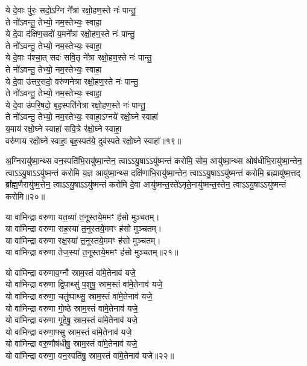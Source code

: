 ये दे॒वाः पु॑रः॒ सदो॒ऽग्नि ने᳚त्रा रक्षो॒हण॒स्ते नः॑ पान्तु॒\\
ते नो॑ऽवन्तु॒  तेभ्यो॒ नम॒स्तेभ्यः॒ स्वाहा॒\\
ये दे॒वा द॑क्षिण॒सदो॑ य॒मने᳚त्रा रक्षो॒हण॒स्ते नः॑ पान्तु॒\\
ते नो॑ऽवन्तु॒  तेभ्यो॒ नम॒स्तेभ्यः॒ स्वाहा॒\\
ये दे॒वाः प॑श्चा॒त् सदः॑ सवि॒तृ ने᳚त्रा रक्षो॒हण॒स्ते नः॑ पान्तु॒\\
ते नो॑ऽवन्तु॒  तेभ्यो॒ नम॒स्तेभ्यः॒ स्वाहा॒\\
ये दे॒वा उ॑त्तर॒सदो॒ वरु॑णनेत्रा रक्षो॒हण॒स्ते नः॑ पान्तु॒\\
ते नो॑ऽवन्तु॒  तेभ्यो॒ नम॒स्तेभ्यः॒ स्वाहा॒\\
ये दे॒वा उ॑परि॒षदो॒ बृह॒स्पति॑नेत्रा रक्षो॒हण॒स्ते नः॑ पान्तु॒\\
ते नो॑ऽवन्तु॒  तेभ्यो॒ नम॒स्तेभ्यः॒ स्वाहा॒ऽग्नये॑ रक्षो॒घ्ने स्वाहा॑\\
य॒माय॑ रक्षो॒घ्ने स्वाहा॑ सवि॒त्रे र॑क्षो॒घ्ने स्वाहा॒\\
वरु॑णाय रक्षो॒घ्ने स्वाहा॒ बृह॒स्पत॑ये॒ दुव॑स्पते रक्षो॒घ्ने स्वाहा᳚॥१९॥

अ॒ग्निरायु॑ष्मा॒न्थ्स वन॒स्पति॑भि॒रायु॑ष्मा॒न्तेन॒ त्वाऽऽयु॒षा\-ऽऽयु॑ष्मन्तं करोमि॒
सोम॒ आयु॑ष्मा॒न्थ्स ओष॑धीभि॒रायु॑ष्मा॒न्तेन॒ त्वाऽऽयु॒षा\-ऽऽयु॑ष्मन्तं करोमि
य॒ज्ञ आयु॑ष्मा॒न्थ्स दक्षि॑णाभि॒रायु॑ष्मा॒न्तेन॒ त्वाऽऽयु॒षा\-ऽऽयु॑ष्मन्तं करोमि॒
ब्रह्मायु॑ष्म॒त्तद् ब्रा᳚ह्म॒णैरायु॑ष्म॒त्तेन॒ त्वाऽऽयु॒षा\-ऽऽयु॑ष्मन्तं करोमि
दे॒वा आयु॑ष्मन्त॒स्ते॑ऽमृते॒नायु॑ष्मन्त॒स्तेन॒ त्वा\-ऽऽयु॒षाऽऽयु॑ष्मन्तं करोमि॥२०॥

या वा॑मिन्द्रा वरुणा यत॒व्या॑ त॒नूस्तये॒ममꣳ ह॑सो मुञ्चतम्।\\
या वा॑मिन्द्रा वरुणा सह॒स्या॑ त॒नूस्तये॒ममꣳ ह॑सो मुञ्चतम्।\\
या वा॑मिन्द्रा वरुणा रक्ष॒स्या॑ त॒नूस्तये॒ममꣳ ह॑सो मुञ्चतम्।\\
या वा॑मिन्द्रा वरुणा तेज॒स्या॑ त॒नूस्तये॒ममꣳ ह॑सो मुञ्चतम्॥२१॥

यो वा॑मिन्द्रा वरुणाव॒ग्नौ स्राम॒स्तं वा॑मे॒तेनाव॑ यजे॒\\
यो वा॑मिन्द्रा वरुणा द्वि॒पाथ्सु॑ प॒शुषु॒ स्राम॒स्तं वा॑मे॒तेनाव॑ यजे॒\\
यो वा॑मिन्द्रा वरुणा॒ चतु॑ष्पाथ्सु॒ स्राम॒स्तं वा॑मे॒तेनाव॑ यजे॒\\
यो वा॑मिन्द्रा वरुणा गो॒ष्ठे स्राम॒स्तं वा॑मे॒तेनाव॑ यजे॒\\
यो वा॑मिन्द्रा वरुणा गृ॒हेषु॒ स्राम॒स्तं वा॑मे॒तेनाव॑ यजे॒\\
यो वा॑मिन्द्रा वरुणा॒फ्सु स्राम॒स्तं वा॑मे॒तेनाव॑ यजे॒\\
यो वा॑मिन्द्रा वरु॒णौष॑धीषु॒ स्राम॒स्तं वा॑मे॒तेनाव॑ यजे॒\\
यो वा॑मिन्द्रा वरुणा॒ वन॒स्पति॑षु॒ स्राम॒स्तं वा॑मे॒तेनाव॑ यजे॥२२॥

